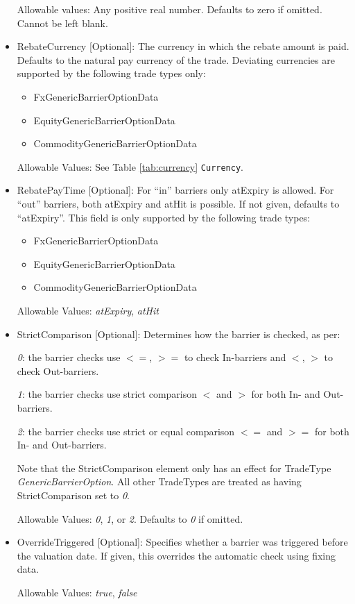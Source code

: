 \begin{itemize}
Allowable values:  Any positive real number. Defaults to zero if omitted. Cannot be left blank.

\item RebateCurrency [Optional]: The currency in which the rebate amount is paid. Defaults to the natural pay currency
  of the trade. Deviating currencies are supported by the following trade types only:

  \begin{itemize}
  \item FxGenericBarrierOptionData
  \item EquityGenericBarrierOptionData
  \item CommodityGenericBarrierOptionData
  \end{itemize}

  Allowable Values: See Table \ref{tab:currency} \lstinline!Currency!.

\item RebatePayTime [Optional]: For ``in'' barriers only atExpiry is allowed. For ``out'' barriers, both atExpiry and
  atHit is possible. If not given, defaults to ``atExpiry''. This field is only supported by the following trade types:

  \begin{itemize}
  \item FxGenericBarrierOptionData
  \item EquityGenericBarrierOptionData
  \item CommodityGenericBarrierOptionData
  \end{itemize}

  Allowable Values: \emph{atExpiry}, \emph{atHit}

\item StrictComparison [Optional]: Determines how the  barrier is checked, as per:

  \emph{0}: the barrier checks use $<=$, $>=$ to check In-barriers and $<$, $>$ to check Out-barriers.
  
  \emph{1}: the barrier checks use strict comparison $<$ and $>$ for both In- and Out-barriers.
  
  \emph{2}: the barrier checks use strict or equal comparison $<=$ and $>=$ for both In- and Out-barriers.
  
  Note that the StrictComparison element only has an effect for TradeType \emph{GenericBarrierOption}. All other TradeTypes are treated as having StrictComparison set to \emph{0}.

  Allowable Values: \emph{0}, \emph{1}, or \emph{2}. Defaults to \emph{0} if omitted.


\item OverrideTriggered [Optional]: Specifies whether a barrier was triggered before the valuation date. If given, this overrides the automatic check using fixing data.

  Allowable Values: \emph{true}, \emph{false}

\end{itemize}

